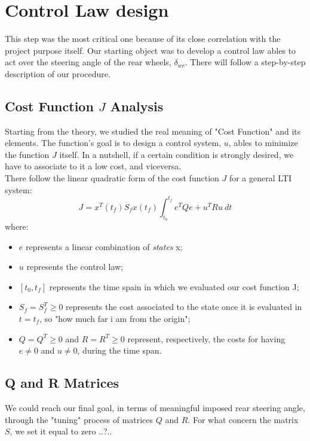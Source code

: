 \documentclass[a4paper,12pt,titlepage]{report}
\numberwithin{figure}{section}
\begin{document}
\section{Control Law design}
This step was the most critical one because of its close correlation with the project purpose itself. Our starting object was to develop a control law ables to act over the steering angle of the rear wheels, $\delta_{wr}$. There will follow a step-by-step description of our procedure.
\subsection{Cost Function $J$ Analysis}
Starting from the theory, we studied the real meaning of "Cost Function" and its elements. The function's goal is to design a control system, $u$, ables to minimize the function $J$ itself. In a nutshell, if a certain condition is strongly desired, we have to associate to it a low cost, and viceversa. \\
There follow the linear quadratic form of the cost function $J$ for a general LTI system:
\begin{equation}
J = x^{T}(t_{f}) S_{f} x(t_{f})\int_{t_{0}}^{t_{f}} e^{T} Q e + u^{T} R u \ dt
\end{equation}
where:
\begin{itemize}
	\item $e$ represents a linear combination of \textit{states} x;
	\item $u$ represents the control law;
	\item $ [t_{0},t_{f}] $ represents the time spain in which we evaluated our cost function J;
	\item $ S_{f} = S_{f}^{T} \geq0 $ represents the cost associated to the state once it is evaluated in $t=t_{f}$, so "how much far i am from the origin";
	\item $ Q=Q^{T}\geq 0 $ and $ R=R^{T}\geq 0 $ represent, respectively, the costs for having $e\neq0$ and $u\neq0$, during the time span.
\end{itemize}
\subsection{Q and R Matrices}
We could reach our final goal, in terms of meaningful imposed rear steering angle, through the "tuning" process of matrices $Q$ and $R$. For what concern the matrix $S$, we set it equal to zero ..?..	
\end{document}
